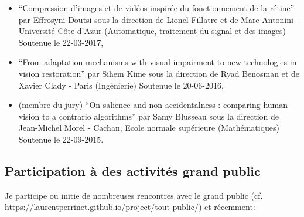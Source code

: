 \documentclass[10pt,french,a4paper,oneside]{article}%
\begin{document}
\begin{itemize}
	\item ``Compression d'images et de vidéos inspirée du fonctionnement de la rétine''	par Effrosyni Doutsi sous la direction de Lionel Fillatre et de Marc Antonini - Université Côte d'Azur	(Automatique, traitement du signal et des images) 	Soutenue le 22-03-2017,
	\item ``From adaptation mechanisms with visual impairment to new technologies in vision restoration'' par Sihem Kime sous la direction de Ryad Benosman et de Xavier Clady - Paris (Ingénierie) Soutenue le 20-06-2016,
	\item (membre du jury) ``On salience and non-accidentalness : comparing human vision to a contrario algorithms''  par Samy Blusseau sous la direction de Jean-Michel Morel - Cachan, Ecole normale supérieure	(Mathématiques) Soutenue le 22-09-2015.
\end{itemize} %
	

\subsection{Participation à des activités grand public} %

Je participe ou initie de nombreuses rencontres avec le grand public (cf. \url{https://laurentperrinet.github.io/project/tout-public/}) et récemment:
\end{document}
